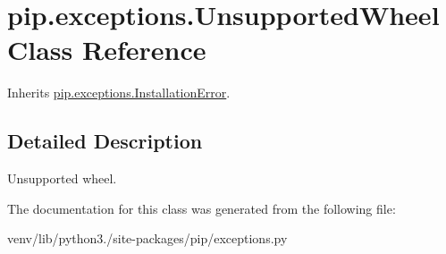 \hypertarget{classpip_1_1exceptions_1_1_unsupported_wheel}{}\section{pip.\+exceptions.\+Unsupported\+Wheel Class Reference}
\label{classpip_1_1exceptions_1_1_unsupported_wheel}


Inherits \hyperlink{classpip_1_1exceptions_1_1_installation_error}{pip.\+exceptions.\+Installation\+Error}.



\subsection{Detailed Description}
\begin{DoxyVerb}Unsupported wheel.\end{DoxyVerb}
 

The documentation for this class was generated from the following file\+:\begin{DoxyCompactItemize}
\item 
venv/lib/python3./site-\/packages/pip/exceptions.\+py\end{DoxyCompactItemize}

